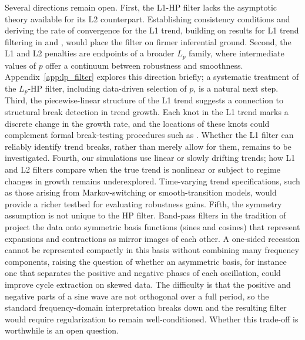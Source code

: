 \documentclass[10pt]{article}
\begin{document}
Several directions remain open. First, the L1-HP filter lacks the asymptotic theory available for its L2 counterpart. Establishing consistency conditions and deriving the rate of convergence for the L1 trend, building on results for L1 trend filtering in \citet{kim_etal2009} and \citet{tibshirani2014}, would place the filter on firmer inferential ground. Second, the L1 and L2 penalties are endpoints of a broader $L_p$ family, where intermediate values of $p$ offer a continuum between robustness and smoothness. Appendix~\ref{app:lp_filter} explores this direction briefly; a systematic treatment of the $L_p$-HP filter, including data-driven selection of $p$, is a natural next step. Third, the piecewise-linear structure of the L1 trend suggests a connection to structural break detection in trend growth. Each knot in the L1 trend marks a discrete change in the growth rate, and the locations of these knots could complement formal break-testing procedures such as \citet{bai_perron1998}. Whether the L1 filter can reliably identify trend breaks, rather than merely allow for them, remains to be investigated. Fourth, our simulations use linear or slowly drifting trends; how L1 and L2 filters compare when the true trend is nonlinear or subject to regime changes in growth remains underexplored. Time-varying trend specifications, such as those arising from Markov-switching or smooth-transition models, would provide a richer testbed for evaluating robustness gains. Fifth, the symmetry assumption is not unique to the HP filter. Band-pass filters in the tradition of \citet{baxter_king1999} project the data onto symmetric basis functions (sines and cosines) that represent expansions and contractions as mirror images of each other. A one-sided recession cannot be represented compactly in this basis without combining many frequency components, raising the question of whether an asymmetric basis, for instance one that separates the positive and negative phases of each oscillation, could improve cycle extraction on skewed data. The difficulty is that the positive and negative parts of a sine wave are not orthogonal over a full period, so the standard frequency-domain interpretation breaks down and the resulting filter would require regularization to remain well-conditioned. Whether this trade-off is worthwhile is an open question.
\end{document}
